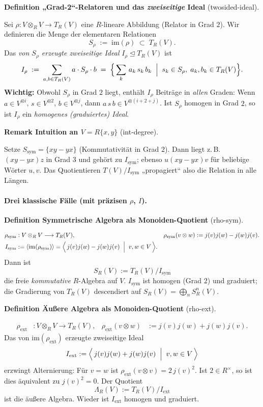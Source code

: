 \documentclass[10pt, letterpaper]{article}
\newcommand{\CustomHeading}[3]{%
  \par\medskip\noindent%
  \textbf{#1 #2} \textnormal{(#3)}.\enskip%
}
\newenvironment{DEF}[2]{\begin{unitbox}\CustomHeading{Definition}{#1}{#2}}{\end{unitbox}}
\newenvironment{REM}[2]{\begin{unitbox}\CustomHeading{Remark}{#1}{#2}}{\end{unitbox}}
\begin{document}
\begin{DEF}{„Grad-2“-Relatoren und das \emph{zweiseitige} Ideal}{twosided-ideal}
Sei $\rho:V\otimes_R V\to T_R(V)$ eine $R$-lineare Abbildung (Relator in Grad $2$).
Wir definieren die Menge der elementaren Relationen
\[
S_\rho\;:=\;\mathrm{im}(\rho)\;\subset\;T_R(V).
\]
Das \emph{von $S_\rho$ erzeugte zweiseitige Ideal} $I_\rho\unlhd T_R(V)$ ist
\[
I_\rho\;:=\;\sum_{a,b\in T_R(V)} a\cdot S_\rho\cdot b
\;=\;\Big\{\sum_k\,a_k\,s_k\,b_k\;\Bigm|\; s_k\in S_\rho,\;a_k,b_k\in T_R(V)\Big\}.
\]
\textbf{Wichtig:} Obwohl $S_\rho$ in Grad $2$ liegt, enthält $I_\rho$ Beiträge in \emph{allen} Graden:
Wenn $a\in V^{\otimes i}$, $s\in V^{\otimes 2}$, $b\in V^{\otimes j}$, dann
$a\,s\,b\in V^{\otimes(i+2+j)}$.
Ist $S_\rho$ homogen in Grad $2$, so ist $I_\rho$ ein \emph{homogenes (graduiertes) Ideal}.
\end{DEF}

\begin{REM}{Intuition an $V=R\{x,y\}$}{int-degree}
Setze $S_\mathrm{sym}=\{xy-yx\}$ (Kommutativität in Grad $2$).
Dann liegt z.\,B. $(xy-yx)z$ in Grad $3$ und gehört zu $I_\mathrm{sym}$;
ebenso $u(xy-yx)v$ für beliebige Wörter $u,v$.
Das Quotientieren $T(V)/I_\mathrm{sym}$ „propagiert“ also die Relation in alle Längen.
\end{REM}

\paragraph{Drei klassische Fälle (mit präzisen $\rho$, $I$).}

\begin{DEF}{Symmetrische Algebra als Monoiden-Quotient}{rho-sym}
\begin{align*}
\rho_{\mathrm{sym}} &: V\otimes_R V \longrightarrow T_R(V), &
\rho_{\mathrm{sym}}(v\otimes w) &:= j(v)j(w)-j(w)j(v).\\
I_{\mathrm{sym}} &:= \langle \mathrm{im}(\rho_{\mathrm{sym}})\rangle
= \Big\langle\, j(v)j(w)-j(w)j(v)\;\Bigm|\; v,w\in V\,\Big\rangle.
\end{align*}
Dann ist
\[
S_R(V):=T_R(V)\big/I_{\mathrm{sym}}
\]
die freie \emph{kommutative} $R$-Algebra auf $V$.
$I_{\mathrm{sym}}$ ist homogen (Grad $2$) und graduiert; die Gradierung von $T_R(V)$
descendiert auf $S_R(V)=\bigoplus_n S^n_R(V)$.
\end{DEF}

\begin{DEF}{Äußere Algebra als Monoiden-Quotient}{rho-ext}
\begin{align*}
\rho_{\mathrm{ext}} &: V\otimes_R V \longrightarrow T_R(V), &
\rho_{\mathrm{ext}}(v\otimes w) &:= j(v)j(w)+j(w)j(v).
\end{align*}
Das von $\mathrm{im}(\rho_{\mathrm{ext}})$ erzeugte zweiseitige Ideal
\[
I_{\mathrm{ext}}:=\Big\langle\, j(v)j(w)+j(w)j(v)\;\Bigm|\; v,w\in V\,\Big\rangle
\]
erzwingt Alternierung: Für $v=w$ ist $\rho_{\mathrm{ext}}(v\otimes v)=2\,j(v)^2$.
Ist $2\in R^\times$, so ist dies äquivalent zu $j(v)^2=0$.
Der Quotient
\[
\Lambda_R(V):=T_R(V)\big/I_{\mathrm{ext}}
\]
ist die äußere Algebra. Wieder ist $I_{\mathrm{ext}}$ homogen und graduiert.
\end{DEF}
\end{document}
